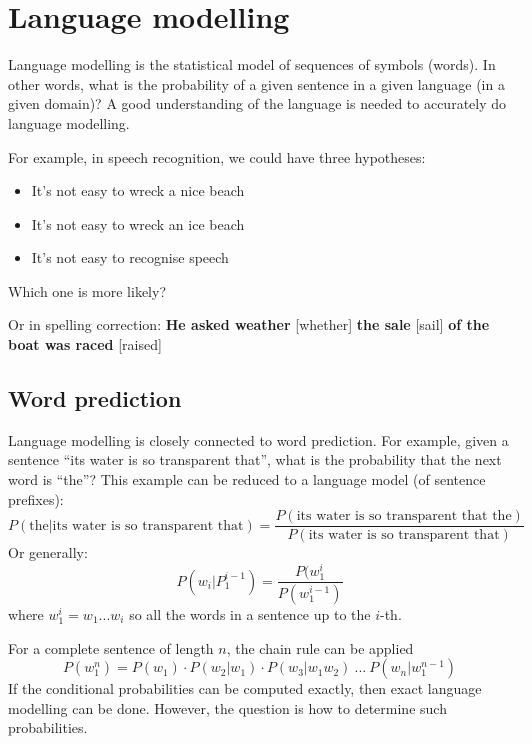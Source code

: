 \documentclass[Report.tex]{subfiles}
\begin{document}
\section{Language modelling}
Language modelling is the statistical model of sequences of
symbols (words). In other words, what is the probability
of a given sentence in a given language (in a given domain)?
A good understanding of the language is needed to accurately
do language modelling.

For example, in speech recognition, we could have three hypotheses:
\begin{itemize}
\item It's not easy to wreck a nice beach
\item It's not easy to wreck an ice beach
\item It's not easy to recognise speech
\end{itemize}
Which one is more likely?

Or in spelling correction: \textbf{He asked weather} [whether]
\textbf{the sale} [sail] \textbf{of the boat was raced} [raised]

\subsection{Word prediction}
Language modelling is closely connected to word prediction. For example,
given a sentence ``its water is so transparent that'', what is the
probability that the next word is ``the''? This example can be reduced
to a language model (of sentence prefixes):
\begin{equation}
  P(\text{the} | \text{its water is so transparent that}) =
  \frac{P(\text{its water is so transparent that the})}{P(\text{its water is so transparent that})}
\end{equation}
Or generally:
\begin{equation}
P(w_i | P^{i-1}_1) = \frac{P(w^i_1}{P(w^{i-1}_1)}
\end{equation}
where $w^i_1 = w_1 ... w_i$ so all the words in a sentence up to the $i$-th.

For a complete sentence of length $n$, the chain rule can be applied
\begin{equation}
P(w^n_1) = P(w_1) \cdot P(w_2 | w_1) \cdot P(w_3 | w_1w_2)\ ...\ P(w_n | w^{n-1}_1)
\end{equation}
If the conditional probabilities can be computed exactly, then exact
language modelling can be done. However, the question is how to determine
such probabilities.
\end{document}
